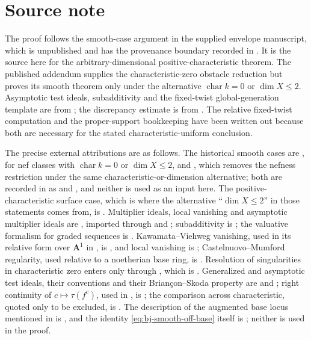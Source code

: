 \section{Source note}
\label{sec:ch40-source-note}

The proof follows the smooth-case argument in the supplied envelope
manuscript, which is unpublished and has the provenance boundary
recorded in .  It is the source here for the arbitrary-dimensional
positive-characteristic theorem.  The published addendum \cite{BJ22b}
supplies the characteristic-zero obstacle reduction but proves its smooth
theorem only under the alternative
$\operatorname{char}k=0$ or $\dim X\le2$.  Asymptotic test ideals,
subadditivity and the fixed-twist global-generation template are from
\cite[Proposition~3.1 and Theorem~4.1]{MustataTest}; the discrepancy estimate
is from \cite{Canton}.  The relative fixed-twist computation and the
proper-support bookkeeping have been written out because both are necessary
for the stated characteristic-uniform conclusion.

The precise external attributions are as follows.  The historical smooth
cases are \cite[Theorem~5.20]{BJ22}, for nef classes with
$\operatorname{char}k=0$ or $\dim X\le2$, and \cite[Theorem~A]{BJ22b},
which removes the nefness restriction under the same
characteristic-or-dimension alternative; both are recorded in
 as  and
, and neither is used as an input here.
The positive-characteristic surface case, which is where the alternative
``$\dim X\le2$'' in those statements comes from, is
\cite[\S4 and Theorem~4.6]{GJKM19}.  Multiplier ideals, local vanishing and
asymptotic multiplier ideals are \cite[Chapters~9 and~11]{PAG2}, imported
through  and
; subadditivity is
\cite[Theorem~2.3]{DEL00}; the valuative formalism for graded sequences is
\cite{JM12}.  Kawamata--Viehweg vanishing, used in its relative form over
$\mathbf A^1$ in , is
\cite[\S4.3]{PAG1}, and local vanishing is \cite[Theorem~9.4.1]{PAG2};
Castelnuovo--Mumford regularity, used relative to a noetherian base ring, is
\cite[\S1.8]{PAG1}.  Resolution of singularities in characteristic zero
enters only through , which is
\cite{Hironaka1964I}.  Generalized and asymptotic test ideals, their
conventions and their Brian\c con--Skoda property are
\cite{HY03} and \cite{ST12}; right continuity of $c\mapsto\tau(f^c)$,
used in , is \cite[Theorem~6.6]{ST12}; the comparison
across characteristic, quoted only to be excluded, is
\cite[Theorem~6.8]{HY03}.  The description of the augmented base locus
mentioned in  is \cite{ELMNP05}, and the
identity \eqref{eq:bj-smooth-off-base} itself is
\cite[Lemma~1.5]{BJ22b}; neither is used in the proof.


